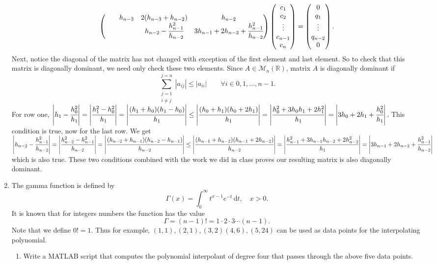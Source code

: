 \documentclass{article}
\begin{document}
\begin{enumerate}[label = {\arabic*}]
\[\begin{pmatrix}
		&					 &   h_{n - 3}   &     2(h_{n - 3} + h_{n - 2}) 	& 	   h_{n - 2}     \\
		&					 &			     & h_{n - 2} - \cfrac{h_{n - 1}^2}{h_{n - 2}} & 3h_{n - 1} + 2h_{n - 2} + \cfrac{h_{n - 1}^2}{h_{n - 2}}
		\end{pmatrix}
		\begin{pmatrix}
			c_1       \\
			c_2       \\
			\vdots    \\
			c_{n - 1} \\
			c_n
		\end{pmatrix} =
		\begin{pmatrix}
			0         \\
			q_1       \\
			\vdots    \\
			q_{n - 2} \\
			0
		\end{pmatrix}.\]
		\hspace{15pt} Next, notice the diagonal of the matrix has not changed with exception of the first element and last element. So to check that this matrix is diagonally dominant, we need only check these two elements. Since $A \in \mathcal{M}_n(\mathbb{R})$, matrix $A$ is diagonally dominant if \[\sum_{\substack{j = 1 \\ i \neq j}}^{j = n} |a_{ij}| \leq |a_{ii}| \quad\quad \forall i \in {0, 1, ..., n - 1}.\] For row one, $\left|h_1 - \cfrac{h_0^2}{h_1}\right| = \left| \cfrac{h_1^2 - h_0^2}{h_1}\right| = \left| \cfrac{(h_1 + h_0)(h_1 - h_0)}{h_1}\right| \leq \left|\cfrac{(h_0 + h_1)(h_0 + 2h_1)}{h_1}\right| = \left| \cfrac{h_0^2 + 3h_0 h_1 + 2h_1^2}{h_1}\right| = \left| 3h_0 + 2h_1 + \cfrac{h_0^2}{h_1} \right|$. This condition is true, now for the last row. We get $\left|h_{n - 2} - \cfrac{h_{n - 1}^2}{h_{n - 2}}\right| = \left| \cfrac{h_{n - 2}^2 - h_{n - 1}^2}{h_{n - 2}}\right| = \left| \cfrac{(h_{n - 2} + h_{n - 1})(h_{n - 2} - h_{n - 1})}{h_{n - 2}}\right| \leq \left|\cfrac{(h_{n - 1} + h_{n - 2})(h_{n - 1} + 2h_{n - 2})}{h_{n - 2}}\right| = \left| \cfrac{h_{n - 1}^2 + 3h_{n - 1} h_{n - 2} + 2h_{n - 2}^2}{h_1}\right| = \left| 3h_{n - 1} + 2h_{n - 2} + \cfrac{h_{n - 1}^2}{h_{n - 2}}\right|$ which is also true. These two conditions combined with the work we did in class proves our resulting matrix is also diagonally dominant. \\
		
		\item The gamma function is defined by \[\Gamma(x) = \int_{0}^{\infty} t^{x - 1}e^{-t} \, \mathrm{d}t, \quad x > 0.\] It is known that for integers numbers the function has the value \[\Gamma = (n - 1)! = 1 \cdot 2 \cdot 3 \cdots (n - 1).\] Note that we define $0! = 1$. Thus for example, $(1, 1), (2, 1), (3, 2) (4, 6), (5, 24)$ can be used as data points for the interpolating polynomial.
		\begin{enumerate}
			\item Write a MATLAB script that computes the polynomial interpolant of degree four that passes through the above five data points.
			

\end{enumerate}
\end{enumerate}
\end{document}

